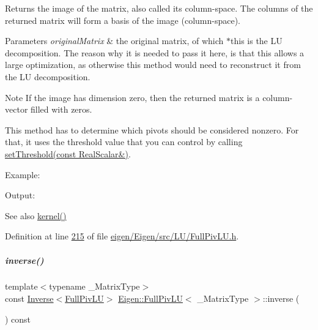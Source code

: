 \begin{DoxyReturn}{Returns}
the image of the matrix, also called its column-\/space. The columns of the returned matrix will form a basis of the image (column-\/space).
\end{DoxyReturn}

\begin{DoxyParams}{Parameters}
{\em original\+Matrix} & the original matrix, of which $\ast$this is the LU decomposition. The reason why it is needed to pass it here, is that this allows a large optimization, as otherwise this method would need to reconstruct it from the LU decomposition.\\
\hline
\end{DoxyParams}
\begin{DoxyNote}{Note}
If the image has dimension zero, then the returned matrix is a column-\/vector filled with zeros.

This method has to determine which pivots should be considered nonzero. For that, it uses the threshold value that you can control by calling \hyperlink{group___l_u___module_a414592d82de98f5bd075965caf56d681}{set\+Threshold(const Real\+Scalar\&)}.
\end{DoxyNote}
Example\+: 
\begin{DoxyCodeInclude}
\end{DoxyCodeInclude}
 Output\+: 
\begin{DoxyVerbInclude}
\end{DoxyVerbInclude}


\begin{DoxySeeAlso}{See also}
\hyperlink{group___l_u___module_a70f52eeb2cd07dfbf790fce106fb4015}{kernel()} 
\end{DoxySeeAlso}


Definition at line \hyperlink{eigen_2_eigen_2src_2_l_u_2_full_piv_l_u_8h_source_l00215}{215} of file \hyperlink{eigen_2_eigen_2src_2_l_u_2_full_piv_l_u_8h_source}{eigen/\+Eigen/src/\+L\+U/\+Full\+Piv\+L\+U.\+h}.

\mbox{\label{group___l_u___module_ae6f4bb55f859f6353f99cf15ecff4b25}} 
\subparagraph{\texorpdfstring{inverse()}{inverse()}\hspace{0.1cm}{\footnotesize\ttfamily [1/2]}}
{\footnotesize\ttfamily template$<$typename \+\_\+\+Matrix\+Type$>$ \\
const \hyperlink{class_eigen_1_1_inverse}{Inverse}$<$\hyperlink{group___l_u___module_class_eigen_1_1_full_piv_l_u}{Full\+Piv\+LU}$>$ \hyperlink{group___l_u___module_class_eigen_1_1_full_piv_l_u}{Eigen\+::\+Full\+Piv\+LU}$<$ \+\_\+\+Matrix\+Type $>$\+::inverse (\begin{DoxyParamCaption}{ }\end{DoxyParamCaption}) const\hspace{0.3cm}{\ttfamily [inline]}}

